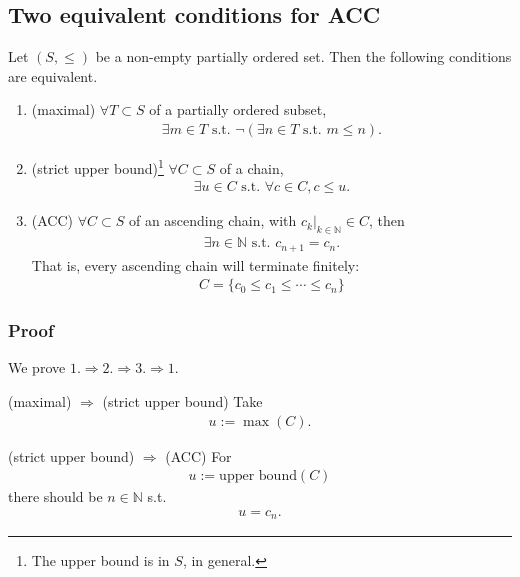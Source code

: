 \documentclass[11pt]{book}
\begin{document}
\subsection{Two equivalent conditions for ACC}
\label{MoreACC}
Let $(S, \leq)$ be a non-empty partially ordered set.
Then the following conditions are equivalent.
\begin{enumerate}
\item (maximal) $\forall T \subset S$ of a partially ordered subset,
\begin{eqnarray}
\exists m \in T \text{ s.t. } \lnot( \exists n \in T \text{ s.t. } m \leq n).
\end{eqnarray}

\item (strict upper bound)\footnote{The upper bound is in $S$, in general.} $\forall C \subset S$ of a chain,
\begin{eqnarray}
\exists u \in C \text{ s.t. } \forall c \in C, c \leq u.
\end{eqnarray}
 
\item (ACC) $\forall C \subset S$ of an ascending chain, with $\left. c_k \right|_{k \in \mathbb{N}} \in C$, then
\begin{eqnarray}
\exists n \in \mathbb{N} \text{ s.t. } c_{n+1} = c_{n}.
\end{eqnarray}
That is, every ascending chain will terminate finitely:
\begin{eqnarray}
C = \{c_0 \leq c_1 \leq \cdots \leq c_n\}
\end{eqnarray}

\end{enumerate}

\subsubsection{Proof}
We prove $1. \Rightarrow 2. \Rightarrow 3. \Rightarrow 1.$
 
(maximal) $\Rightarrow $ (strict upper bound)
Take
\begin{eqnarray}
u := \max (C).
\end{eqnarray}

(strict upper bound) $\Rightarrow$ (ACC)
For
\begin{eqnarray}
u := \text{upper bound}(C)
\end{eqnarray}
there should be $n \in \mathbb{N}$ s.t.
\begin{eqnarray}
u = c_n.
\end{eqnarray}
\end{document}
